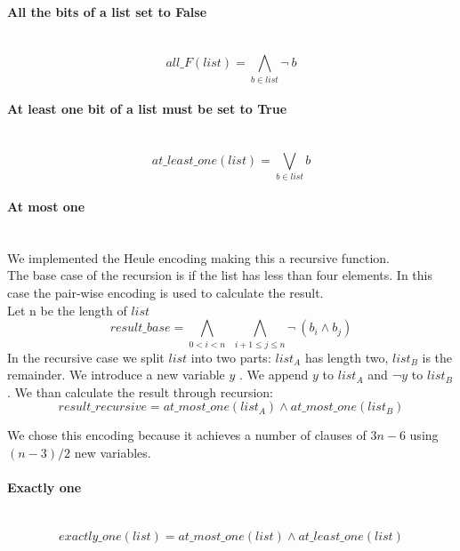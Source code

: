   \paragraph*{All the bits of a list set to False} \hfill \\
    \begin{equation}
      all\_F(list) = \bigwedge_{b \in list}\neg \ b
    \end{equation}
  
    \paragraph*{At least one bit of a list must be set to True} \hfill \\
    \begin{equation}
      at\_least\_one(list) = \bigvee_{b \in list} b
    \end{equation}

  \paragraph*{At most one} \hfill \\
    We implemented the Heule encoding making this a recursive function.\\
    The base case of the recursion is if the list has less than four elements. In this case the 
    pair-wise encoding is used to calculate the result.\\
    Let n be the length of \(list\) 
    \begin{equation}
            result\_base = \bigwedge_{0 < i < n} \ \ \bigwedge_{i+1 \leq j \leq n}\neg \ (b_i \land b_j)
    \end{equation}
    In the recursive case we split \(list\)  into two parts: \(list_A\)  has length two, \(list_B\)  is
    the remainder. We introduce a new variable \(y\) . We append \(y\)  to \(list_A\)  and ¬\( y\)  to 
    \(list_B\) . We than calculate the result through recursion:
    \begin{equation}
        result\_recursive = at\_most\_one(list_A) \land at\_most\_one(list_B)
    \end{equation}

    We chose this encoding because it achieves a number of clauses of \(3n - 6\)  using \((n-3)/2\) new variables. \\

  \paragraph*{Exactly one} \hfill \\
    \begin{equation}
      exactly\_one(list) = at\_most\_one(list) \land at\_least\_one(list)
    \end{equation}

